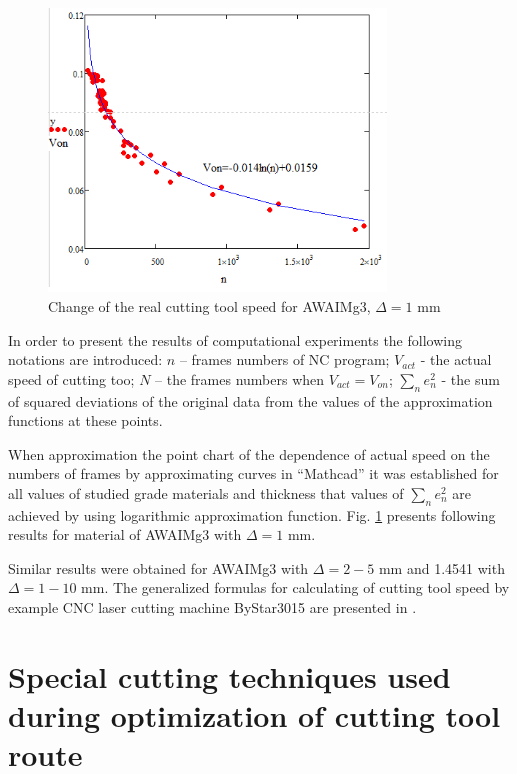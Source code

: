 \documentclass[runningheads]{llncs}
\begin{document}
\begin{figure}
  \begin{center}
  \includegraphics[width=0.8\textwidth]{plot.png}
  \caption{Change of the real cutting tool speed for AWAIMg3, $\Delta=1$ mm}
  \label{plot}
  \end{center}
\end{figure}

In order to present the results of computational experiments
the following notations are introduced:
$n$ – frames numbers of NC program;
$V_{act}$ - the actual speed of cutting too;
$N$ – the frames numbers when $V_{act}=V_{on}$;
$\sum_n e_n^2$  - the sum of squared deviations of the
original data from the values of the approximation functions at these points.

When approximation the point chart
of the dependence of actual speed
on the numbers of frames by approximating curves in ``Mathcad''
it was established for all values of studied grade materials
and thickness that values of $\sum_n e_n^2$
are achieved by using logarithmic approximation function.
Fig. \ref{plot} presents following results for material of AWAIMg3 with $\Delta=1$ mm.

Similar results were obtained for AWAIMg3 with $\Delta=2-5$ mm
and 1.4541 with $\Delta=1-10$ mm.
The generalized formulas for calculating of cutting tool speed
by example CNC laser cutting machine ByStar3015 are presented in \cite{ru28}.

\section{Special cutting techniques used during optimization of cutting tool route}
\end{document}
